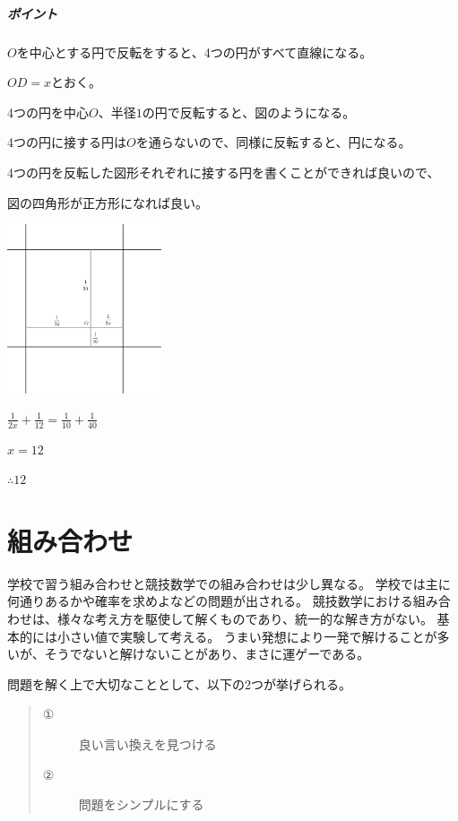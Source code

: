 \documentclass[uplatex,fleqn]{jsbook}
\begin{document}
\paragraph{ポイント}$O$を中心とする円で反転をすると、4つの円がすべて直線になる。

\begin{answer}
    $OD=x$とおく。

    4つの円を中心$O$、半径$1$の円で反転すると、図のようになる。

    4つの円に接する円は$O$を通らないので、同様に反転すると、円になる。

    4つの円を反転した図形それぞれに接する円を書くことができれば良いので、

    図の四角形が正方形になれば良い。

    \includegraphics[clip,height=5cm]{figures/practice4_ans.pdf}

    $\frac{1}{2x}+\frac{1}{12}=\frac{1}{10}+\frac{1}{40}$

    $x=12$

    $\therefore 12$
\end{answer}

\chapter{組み合わせ}
学校で習う組み合わせと競技数学での組み合わせは少し異なる。
学校では主に何通りあるかや確率を求めよなどの問題が出される。
競技数学における組み合わせは、様々な考え方を駆使して解くものであり、統一的な解き方がない。
基本的には小さい値で実験して考える。
うまい発想により一発で解けることが多いが、そうでないと解けないことがあり、まさに運ゲーである。

問題を解く上で大切なこととして、以下の2つが挙げられる。
\begin{quote}
    \begin{description}
        \item[①]良い言い換えを見つける
        \item[②]問題をシンプルにする
    \end{description}
\end{quote}
\end{document}
